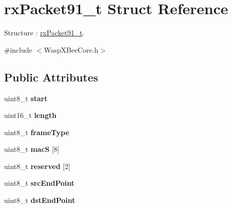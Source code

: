 \hypertarget{structrx_packet91__t}{}\section{rx\+Packet91\+\_\+t Struct Reference}
\label{structrx_packet91__t}


Structure \+: \hyperlink{structrx_packet91__t}{rx\+Packet91\+\_\+t}.  




{\ttfamily \#include $<$Wasp\+X\+Bee\+Core.\+h$>$}

\subsection*{Public Attributes}
\begin{DoxyCompactItemize}
\item 
uint8\+\_\+t {\bfseries start}\hypertarget{structrx_packet91__t_a348dd98ef05402a5c8cd353a453135d4}{}\label{structrx_packet91__t_a348dd98ef05402a5c8cd353a453135d4}

\item 
uint16\+\_\+t {\bfseries length}\hypertarget{structrx_packet91__t_a10999e4694fb3b957fa4c85aa6a8db5a}{}\label{structrx_packet91__t_a10999e4694fb3b957fa4c85aa6a8db5a}

\item 
uint8\+\_\+t {\bfseries frame\+Type}\hypertarget{structrx_packet91__t_ad5c2cef2c4fbb5cab2fd9263a165f352}{}\label{structrx_packet91__t_ad5c2cef2c4fbb5cab2fd9263a165f352}

\item 
uint8\+\_\+t {\bfseries macS} \mbox{[}8\mbox{]}\hypertarget{structrx_packet91__t_af8f415a5f5ffab41dc6b1c27e07fae08}{}\label{structrx_packet91__t_af8f415a5f5ffab41dc6b1c27e07fae08}

\item 
uint8\+\_\+t {\bfseries reserved} \mbox{[}2\mbox{]}\hypertarget{structrx_packet91__t_a464bb6e2d8020a05b3e0841485a4440b}{}\label{structrx_packet91__t_a464bb6e2d8020a05b3e0841485a4440b}

\item 
uint8\+\_\+t {\bfseries src\+End\+Point}\hypertarget{structrx_packet91__t_afb7d2e9b9d40f8eb83079b83192c0868}{}\label{structrx_packet91__t_afb7d2e9b9d40f8eb83079b83192c0868}

\item 
uint8\+\_\+t {\bfseries dst\+End\+Point}\hypertarget{structrx_packet91__t_a7b2614aa93de9ba1808012a099a5ebd0}{}\label{structrx_packet91__t_a7b2614aa93de9ba1808012a099a5ebd0}


\end{DoxyCompactItemize}
